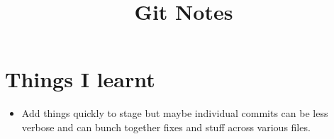 \documentclass{../template/texnote}
\title{Git Notes}
\begin{document}
    \maketitle {}
	\section{Things I learnt}
	\begin{itemize}
		\item Add things quickly to stage but maybe individual commits can be less verbose and can bunch together fixes and stuff across various files.
	\end{itemize}
    \printbibliography
\end{document}

